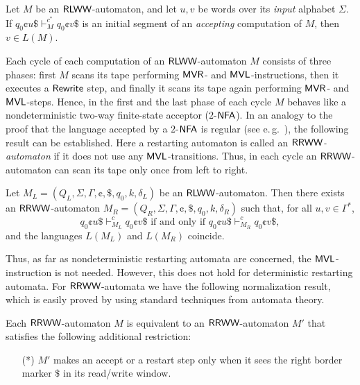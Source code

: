 \begin{proposition}\label{proposition:correctness-preserving-rlww}
Let $M$ be an $\textup{\sf RLWW}$-automaton, and let $u, v$ be words over its \emph{input} alphabet $\Sigma$. If $q_0 \cent u \$ \vdash_M^{c^*} q_0 \cent v \$$ is an initial segment of an \emph{accepting} computation of $M$, then $v \in L(M)$.
\end{proposition}

Each cycle of each computation of an $\textup{\sf RLWW}$-automaton $M$ consists of three phases: first $M$ scans its tape performing $\textup{\sf MVR}$- and $\textup{\sf MVL}$-instructions, then it executes a $\textup{\sf Rewrite}$ step, and finally it scans its tape again performing $\textup{\sf MVR}$- and $\textup{\sf MVL}$-steps. Hence, in the first and the last phase of each cycle $M$ behaves like a nondeterministic two-way finite-state acceptor ($2$-$\textup{\sf NFA}$). In an analogy to the proof that the language accepted by a $2$-$\textup{\sf NFA}$ is regular (see e.\,g.\ \citep{HopcroftMotwaniUllman07}), the following result can be established. Here a restarting automaton is called an \emph{$\textup{\sf RRWW}$-automaton} if it does not use any $\textup{\sf MVL}$-transitions. Thus, in each cycle an $\textup{\sf RRWW}$-automaton can scan its tape only once from left to right.

\begin{theorem}
Let $M_L = (Q_L, \Sigma, \Gamma, \cent, \$, q_0, k, \delta_L)$ be an $\textup{\sf RLWW}$-automaton. Then there exists an $\textup{\sf RRWW}$-automaton $M_R = (Q_R, \Sigma, \Gamma, \cent, \$, q_0, k, \delta_R)$ such that, for all $u, v \in \Gamma^*$, $$q_0 \cent u \$ \vdash_{M_L}^c q_0 \cent v \$ \text{ if and only if } q_0 \cent u \$ \vdash_{M_R}^c q_0 \cent v \$,$$ and the languages $L(M_L)$ and $L(M_R)$ coincide.
\end{theorem}

Thus, as far as nondeterministic restarting automata are concerned, the $\textup{\sf MVL}$-instruction is not needed. However, this does not hold for deterministic restarting automata. For $\textup{\sf RRWW}$-automata we have the following normalization result, which is easily proved by using standard techniques from automata theory.

\begin{lemma}
Each $\textup{\sf RRWW}$-automaton $M$ is equivalent to an $\textup{\sf RRWW}$-automaton $M'$ that satisfies the following additional restriction:
\begin{enumerate}
\item[(*)] $M'$ makes an accept or a restart step only when it sees the right border marker $\$$ in its read/write window.
\end{enumerate}
\end{lemma}

